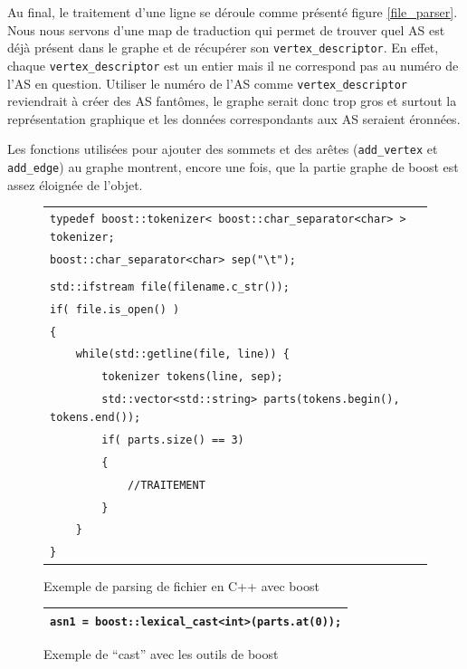 Au final, le traitement d'une ligne se déroule comme présenté figure \ref{file_parser}. Nous nous servons d'une map de traduction qui permet de trouver quel AS est déjà présent dans le graphe et de récupérer son \verb|vertex_descriptor|. En effet, chaque \verb|vertex_descriptor| est un entier mais il ne correspond pas au numéro de l'AS en question. Utiliser le numéro de l'AS comme \verb|vertex_descriptor| reviendrait à créer des AS fantômes, le graphe serait donc trop gros et surtout la représentation graphique et les données correspondants aux AS seraient éronnées.

Les fonctions utilisées pour ajouter des sommets et des arêtes (\verb|add_vertex| et \verb|add_edge|) au graphe montrent, encore une fois, que la partie graphe de boost est assez éloignée de l'objet.

\begin{figure}[H]
   \begin{center}
      \begin{tabular}{l}
        \hline 
 	\verb|typedef boost::tokenizer< boost::char_separator<char> > tokenizer;|\\
 	\verb|boost::char_separator<char> sep("\t");|\\
	\verb||\\
	\verb|std::ifstream file(filename.c_str());|\\
	\verb|if( file.is_open() )|\\
	\verb|{|\\
	\verb|    while(std::getline(file, line)) {|\\
	\verb|        tokenizer tokens(line, sep);|\\
	\verb|        std::vector<std::string> parts(tokens.begin(), tokens.end());|\\
	\verb|        if( parts.size() == 3)|\\
	\verb|        {|\\
	\verb|            //TRAITEMENT|\\
	\verb|        }|\\
	\verb|    }|\\
	\verb|}|\\
        \hline
      \end{tabular}
   \end{center}
\caption{\label{parse_boost} Exemple de parsing de fichier en C++ avec boost}
\end{figure}
 

\begin{figure}[H]
   \begin{center}
      \begin{tabular}{l}
        \hline 
 	\verb|asn1 = boost::lexical_cast<int>(parts.at(0));|\\
        \hline
      \end{tabular}
   \end{center}
\caption{\label{cast_boost} Exemple de ``cast'' avec les outils de boost}
\end{figure}

